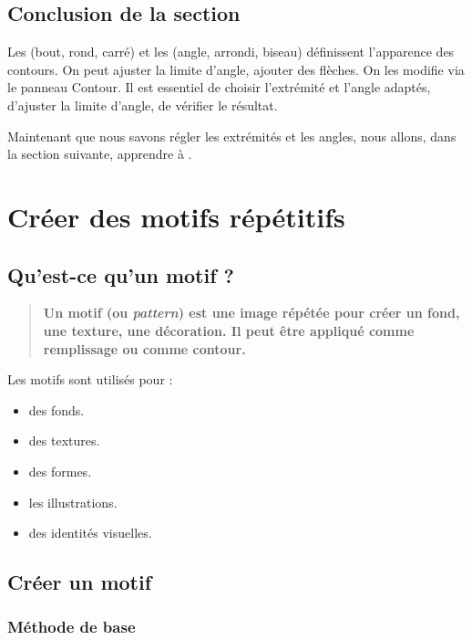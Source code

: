 \subsection*{Conclusion de la section}

Les  (bout, rond, carré) et les  (angle, arrondi, biseau) définissent l'apparence des contours. On peut ajuster la limite d'angle, ajouter des flèches. On les modifie via le panneau Contour. Il est essentiel de choisir l'extrémité et l'angle adaptés, d'ajuster la limite d'angle, de vérifier le résultat.

Maintenant que nous savons régler les extrémités et les angles, nous allons, dans la section suivante, apprendre à .

\section{Créer des motifs répétitifs}

\subsection{Qu'est-ce qu'un motif ?}

\begin{quote}
\textbf{Un motif (ou \emph{pattern}) est une image répétée pour créer un fond, une texture, une décoration. Il peut être appliqué comme remplissage ou comme contour.}
\end{quote}

Les motifs sont utilisés pour :

\begin{itemize}
    \item {} des fonds.
    \item {} des textures.
    \item {} des formes.
    \item {} les illustrations.
    \item {} des identités visuelles.
\end{itemize}

\subsection{Créer un motif}

\subsubsection{Méthode de base}

